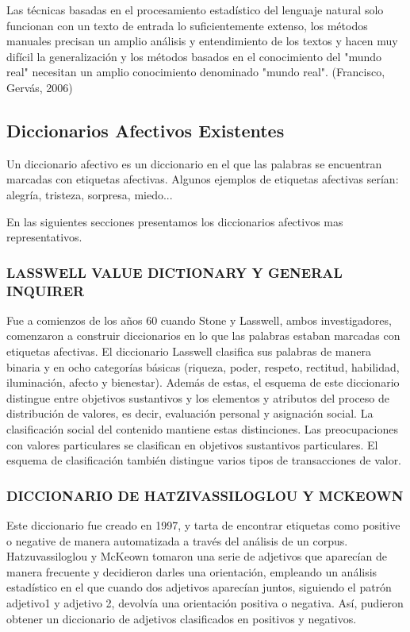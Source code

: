 Las técnicas basadas en el procesamiento estadístico del lenguaje natural solo funcionan con un texto de entrada lo suficientemente extenso, los métodos manuales precisan un amplio análisis y entendimiento de los textos y hacen muy difícil la generalización y los métodos basados en el conocimiento del "mundo real" necesitan un amplio conocimiento denominado "mundo real". (Francisco, Gervás, 2006)
	
\subsection{Diccionarios Afectivos Existentes}
\label{cap2:subsec:diccionarios}
	
	Un diccionario afectivo es un diccionario en el que las palabras se encuentran marcadas con etiquetas afectivas. Algunos ejemplos de etiquetas afectivas serían: alegría, tristeza, sorpresa, miedo...
	
	En las siguientes secciones presentamos los diccionarios afectivos mas representativos.
	
	\subsubsection{LASSWELL VALUE DICTIONARY Y GENERAL INQUIRER}
	
	Fue a comienzos de los años 60 cuando Stone y Lasswell, ambos investigadores, comenzaron a construir diccionarios en lo que las palabras estaban marcadas con etiquetas afectivas.
	El diccionario Lasswell clasifica sus palabras de manera binaria y en ocho categorías básicas (riqueza, poder, respeto, rectitud, habilidad, iluminación, afecto y bienestar). Además de estas, el esquema de este diccionario distingue entre objetivos sustantivos y los elementos y atributos del proceso de distribución de valores, es decir, evaluación personal y asignación social.
	La clasificación social del contenido mantiene estas distinciones. Las preocupaciones con valores particulares se clasifican en objetivos sustantivos particulares. El esquema de clasificación también distingue varios tipos de transacciones de valor.

\subsubsection{DICCIONARIO DE HATZIVASSILOGLOU Y MCKEOWN}
	
	Este diccionario fue creado en 1997, y tarta de encontrar etiquetas como positive o negative de manera automatizada a través del análisis de un corpus.
	Hatzuvassiloglou y McKeown tomaron una serie de adjetivos que aparecían de manera frecuente y decidieron darles una orientación, empleando un análisis estadístico en el que cuando dos adjetivos aparecían juntos, siguiendo el patrón adjetivo1 y adjetivo 2, devolvía una orientación positiva o negativa. 
	Así, pudieron obtener un diccionario de adjetivos clasificados en positivos y negativos.

